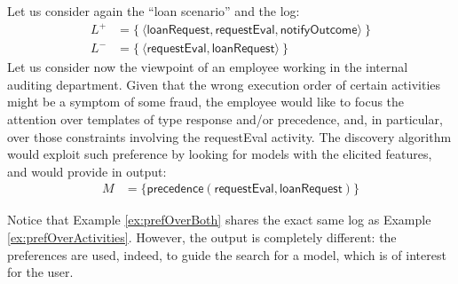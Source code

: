 \begin{example}
\label{ex:prefOverBoth}
Let us consider again the ``loan scenario'' and the log:%
%
\begin{align*}
L^+ & = \{\ \langle \mathsf{loanRequest}, \mathsf{requestEval}, \mathsf{notifyOutcome} \rangle \ \} \\
L^- & = \{\ \langle \mathsf{requestEval}, \mathsf{loanRequest} \rangle \ \}
\end{align*}
%
Let us consider %
now the viewpoint of an employee working in the internal auditing department. Given that the wrong execution order of certain activities might be a symptom of some fraud, the employee would like to focus the attention over %
templates of type \textsf{response} and/or \textsf{precedence}, and, in particular, over %
those constraints involving the \textsf{requestEval} activity. The discovery algorithm would exploit such preference by looking for models with the elicited features, and would provide in output:
%
\begin{align*}
M & = \{ \mathsf{precedence(requestEval,loanRequest)}\}
\tag*{$\square$}
\end{align*}
\end{example}

Notice that Example \ref{ex:prefOverBoth} shares the exact same log as Example \ref{ex:prefOverActivities}. However, the output is completely different: the preferences are used, indeed, to guide the search for a model, which is of interest for the  user.